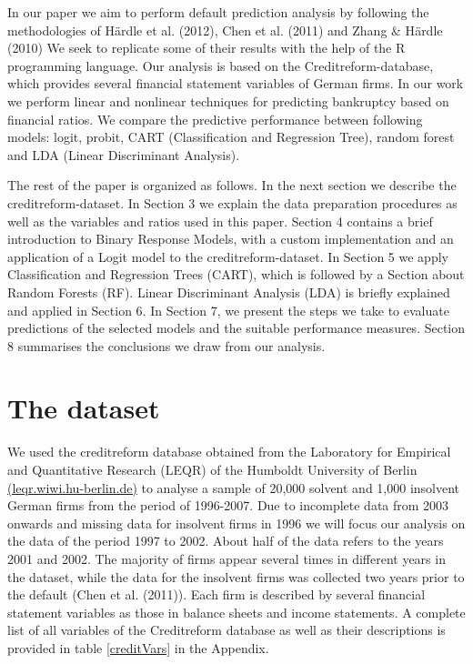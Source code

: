\documentclass{article}
\begin{document}
In our paper we aim to perform default prediction analysis by following the methodologies of H{\"a}rdle et al. (2012), Chen et al. (2011) and Zhang \& H{\"a}rdle (2010) We 
seek to replicate some of their results with the help of the R programming language. Our analysis is based on the Creditreform-database, which provides several 
financial statement variables of German firms. In our work we perform linear and nonlinear techniques for predicting bankruptcy based on financial ratios. We compare 
the predictive performance between following models: logit, probit, CART (Classification and Regression Tree), random forest and LDA (Linear Discriminant Analysis). 

The rest of the paper is organized as follows. In the next section we describe the creditreform-dataset. In Section 3 we explain the data preparation procedures as well as the variables and ratios used in this paper. Section 4 contains a brief introduction to Binary Response Models, with a custom implementation and an application of a Logit model to the creditreform-dataset. In Section 5 we apply Classification and Regression Trees (CART), which is followed by a Section about Random Forests (RF). Linear Discriminant Analysis (LDA) is briefly explained and applied in Section 6. In Section 7, we present the steps we take to evaluate predictions of the selected models and the suitable performance measures. Section 8 summarises the conclusions we draw from our analysis.

\section{The dataset}

We used the creditreform database obtained from the Laboratory for Empirical and Quantitative Research (LEQR) of the Humboldt University of Berlin \href{https://leqr.wiwi.hu-berlin.de/leqr/content/databaseInformation/creditreform/creditreform.htm}{(leqr.wiwi.hu-berlin.de)} to analyse a sample of 20,000 solvent and 1,000 insolvent German firms from the period of 1996-2007. 
Due to incomplete data from 2003 onwards and missing data for insolvent firms in 1996 we will focus our analysis on the data of the period 1997 to 2002. About half of the data refers to the years 2001 and 2002. The majority of firms appear several times in different years in the dataset, while the data for the insolvent firms was collected two years prior to the default (Chen et al. (2011)). Each firm is described by several financial statement variables as those in balance sheets and income statements. A complete list of all variables of the Creditreform database as well as their descriptions is provided in table \ref{creditVars} in the Appendix. 
\end{document}
